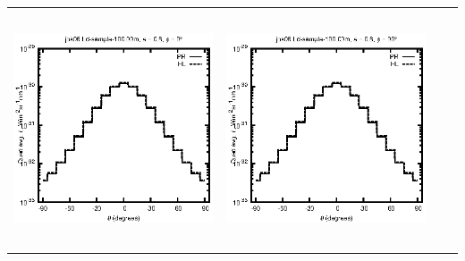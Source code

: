\documentclass[10pt,a4paper]{article}
\begin{document}
\begin{adjustwidth}{-1.2in}{-1.2in}
\begin{tabular}{c c c c}
\includegraphics[height=7cm]{../eps/jok06_Ld_sample_100.00m_fwd.eps} &
\includegraphics[height=7cm]{../eps/jok06_Ld_sample_100.00m_cross.eps} \\
\end{tabular}

\pagebreak


\end{adjustwidth}
\end{document}
